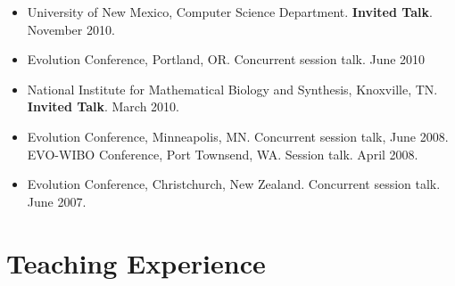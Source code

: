\documentclass[11pt]{article}
\begin{document}
\begin{itemize}
  \item %
    University of New Mexico, Computer Science Department.  \textbf{Invited Talk}. November 2010.

  \item %
    Evolution Conference, Portland, OR. Concurrent session talk. June 2010

  \item %
    National Institute for Mathematical Biology and Synthesis, Knoxville, TN. \textbf{Invited Talk}. March 2010.


  \item %
    Evolution Conference, Minneapolis, MN. Concurrent session talk, June 2008. \\
    EVO-WIBO Conference, Port Townsend, WA. Session talk. April 2008. 

  \item %
    Evolution Conference, Christchurch, New Zealand. Concurrent session talk. June 2007. 

  \end{itemize}

  \newpage
  \section{Teaching Experience}
\end{document}
